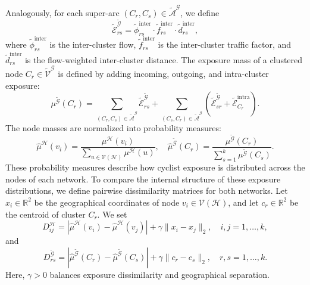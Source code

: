 \documentclass[lettersize,journal]{IEEEtran}
\begin{document}
Analogously, for each super-arc $(C_r,C_s)\in\tilde{\mathcal{A}}^{\mathcal{G}}$, we define
\begin{equation}
    \tilde{\mathcal{E}}^{\tilde{\mathcal{G}}}_{rs}
    =
    \tilde{\phi}^{\mathrm{inter}}_{rs} \cdot
    \tilde{f}^{\mathrm{inter}}_{rs} \cdot
    \tilde{d}^{\mathrm{inter}}_{rs},
\end{equation}
where $\tilde{\phi}^{\mathrm{inter}}_{rs}$ is the inter-cluster flow,
$\tilde{f}^{\mathrm{inter}}_{rs}$ is the inter-cluster traffic factor, and
$\tilde{d}^{\mathrm{inter}}_{rs}$ is the flow-weighted inter-cluster distance. The exposure mass of a clustered node $C_r\in\tilde{\mathcal{V}}^{\mathcal{G}}$ is
defined by adding incoming, outgoing, and intra-cluster exposure:
\begin{equation}
    \mu^{\tilde{\mathcal{G}}}(C_r)
    =
    \sum_{(C_r,C_s)\in\tilde{\mathcal{A}}^{\mathcal{G}}}
    \tilde{\mathcal{E}}^{\tilde{\mathcal{G}}}_{rs}
    +
    \sum_{(C_s,C_r)\in\tilde{\mathcal{A}}^{\mathcal{G}}}
     \left ( \tilde{\mathcal{E}}^{\tilde{\mathcal{G}}}_{sr}
    +
    \tilde{\mathcal{E}}^{\mathrm{intra}}_{C_r} \right ).
\end{equation}
The node masses are normalized into probability measures:
\begin{equation}
    \hat{\mu}^{\mathcal{H}}(v_i)
    =
    \frac{\mu^{\mathcal{H}}(v_i)}
    {\sum_{u\in\mathcal{V}(\mathcal{H})}\mu^{\mathcal{H}}(u)},
    \quad
    \hat{\mu}^{\tilde{\mathcal{G}}}(C_r)
    =
    \frac{\mu^{\tilde{\mathcal{G}}}(C_r)}
    {\sum_{s=1}^{k}\mu^{\tilde{\mathcal{G}}}(C_s)}.
\end{equation}
These probability measures describe how cyclist exposure is distributed across
the nodes of each network. To compare the internal structure of these exposure distributions, we define
pairwise dissimilarity matrices for both networks. Let $x_i\in\mathbb{R}^2$ be
the geographical coordinates of node $v_i\in\mathcal{V}(\mathcal{H})$, and let
$c_r\in\mathbb{R}^2$ be the centroid of cluster $C_r$. We set
\begin{equation}
    D^{\mathcal{H}}_{ij}
    =
    \left|
        \hat{\mu}^{\mathcal{H}}(v_i)
        -
        \hat{\mu}^{\mathcal{H}}(v_j)
    \right|
    +
    \gamma
    \|x_i-x_j\|_2,
    \quad
    i,j=1,\dots,k,
\end{equation}
and
\begin{equation}
    D^{\tilde{\mathcal{G}}}_{rs}
    =
    \left|
        \hat{\mu}^{\tilde{\mathcal{G}}}(C_r)
        -
        \hat{\mu}^{\tilde{\mathcal{G}}}(C_s)
    \right|
    +
    \gamma
    \|c_r-c_s\|_2,
    \quad
    r,s=1,\dots,k.
\end{equation}
Here, $\gamma>0$ balances exposure dissimilarity and geographical separation.
\end{document}
